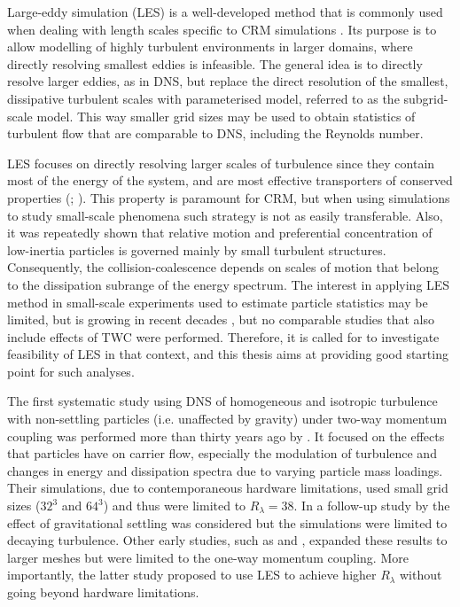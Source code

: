 \documentclass{pracamgren}
\begin{document}
Large-eddy simulation (LES) is a well-developed method that is commonly used when dealing with length scales specific to CRM simulations \parencite{Guichard2017}.
Its purpose is to allow modelling of highly turbulent environments in larger domains, where directly resolving smallest eddies is infeasible.
The general idea is to directly resolve larger eddies, as in DNS, but replace the direct resolution of the smallest, dissipative turbulent scales with parameterised model, referred to as the subgrid-scale model.
This way smaller grid sizes may be used to obtain statistics of turbulent flow that are comparable to DNS, including the Reynolds number.

LES focuses on directly resolving larger scales of turbulence since they contain most of the energy of the system, and are most effective transporters of conserved properties (\cite[367]{Ferziger2020}; \cite[352]{Pope2000}).
This property is paramount for CRM, but when using simulations to study small-scale phenomena such strategy is not as easily transferable.
Also, it was repeatedly shown that relative motion and preferential concentration of low-inertia particles is governed mainly by small turbulent structures.
Consequently, the collision-coalescence depends on scales of motion that belong to the dissipation subrange of the energy spectrum.
The interest in applying LES method in small-scale experiments used to estimate particle statistics may be limited, but is growing in recent decades \parencite{Fede2006, Jin2010, Rosa2017}, but no comparable studies that also include effects of TWC were performed.
Therefore, it is called for to investigate feasibility of LES in that context, and this thesis aims at providing good starting point for such analyses.

\medskip

The first systematic study using DNS of homogeneous and isotropic turbulence with non-settling particles (i.e. unaffected by gravity) under two-way momentum coupling was performed more than thirty years ago by \textcite{Squires1990}.
It focused on the effects that particles have on carrier flow, especially the modulation of turbulence and changes in energy and dissipation spectra due to varying particle mass loadings.
Their simulations, due to contemporaneous hardware limitations, used small grid sizes ($32^3$ and $64^3$) and thus were limited to $R_{\lambda} = 38$.
In a follow-up study by \textcite{Elghobashi1993} the effect of gravitational settling was considered but the simulations were limited to decaying turbulence.
Other early studies, such as \textcite{Wang1993} and \textcite{Yang1998}, expanded these results to larger meshes but were limited to the one-way momentum coupling.
More importantly, the latter study \parencite{Yang1998} proposed to use LES to achieve higher $R_{\lambda}$ without going beyond hardware limitations.
\end{document}
